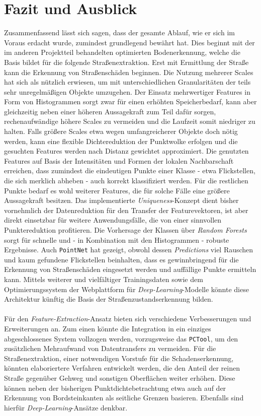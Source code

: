 
\chapter{Fazit und Ausblick}
\label{chap:outro}

Zusammenfassend lässt sich sagen, dass der gesamte Ablauf, wie er sich im Voraus erdacht wurde, zumindest grundlegend bewährt hat. Dies beginnt mit der im anderen Projektteil behandelten optimierten Bodenerkennung, welche die Basis bildet für die folgende Straßenextraktion. Erst mit Ermittlung der Straße kann die Erkennung von Straßenschäden beginnen. Die Nutzung mehrerer Scales hat sich als nützlich erwiesen, um mit unterschiedlichen Granularitäten der teils sehr unregelmäßigen Objekte umzugehen. Der Einsatz mehrwertiger Features in Form von Histogrammen sorgt zwar für einen erhöhten Speicherbedarf, kann aber gleichzeitig neben einer höheren Aussagekraft zum Teil dafür sorgen, rechenaufwändige höhere Scales zu vermeiden und die Laufzeit somit niedriger zu halten. Falls größere Scales etwa wegen umfangreicherer Objekte doch nötig werden, kann eine flexible Dichtereduktion der Punktwolke erfolgen und die gesuchten Features werden nach Distanz gewichtet approximiert. Die genutzten Features auf Basis der Intensitäten und Formen der lokalen Nachbarschaft erreichen, dass zumindest die eindeutigen Punkte einer Klasse - etwa Flickstellen, die sich merklich abheben - auch korrekt klassifiziert werden. Für die restlichen Punkte bedarf es wohl weiterer Features, die für solche Fälle eine größere Aussagekraft besitzen. Das implementierte \textit{Uniqueness}-Konzept dient bisher vornehmlich der Datenreduktion für den Transfer der Featurevektoren, ist aber direkt einsetzbar für weitere Anwendungsfälle, die von einer sinnvollen Punktereduktion profitieren. Die Vorhersage der Klassen über \textit{Random Forests} sorgt für schnelle und - in Kombination mit den Histogrammen - robuste Ergebnisse. Auch \texttt{PointNet} hat gezeigt, obwohl dessen \textit{Predictions} viel Rauschen und kaum gefundene Flickstellen beinhalten, dass es gewinnbringend für die Erkennung von Straßenschäden eingesetzt werden und auffällige Punkte ermitteln kann. Mittels weiterer und vielfältiger Trainingsdaten sowie dem Optimierungssystem der Webplattform für \textit{Deep-Learning}-Modelle könnte diese Architektur künftig die Basis der Straßenzustandserkennung bilden. \\\\
Für den \textit{Feature-Extraction}-Ansatz bieten sich verschiedene Verbesserungen und Erweiterungen an. Zum einen könnte die Integration in ein einziges abgeschlossenes System vollzogen werden, vorzugsweise das \texttt{PCTool}, um den zusätzlichen Mehraufwand von Datentransfers zu vermeiden. Für die Straßenextraktion, einer notwendigen Vorstufe für die Schadenserkennung, könnten elaboriertere Verfahren entwickelt werden, die den Anteil der reinen Straße gegenüber Gehweg und sonstigen Oberflächen weiter erhöhen. Diese können neben der bisherigen Punktdichtebetrachtung etwa auch auf der Erkennung von Bordsteinkanten als seitliche Grenzen basieren. Ebenfalls sind hierfür \textit{Deep-Learning}-Ansätze denkbar. \\
